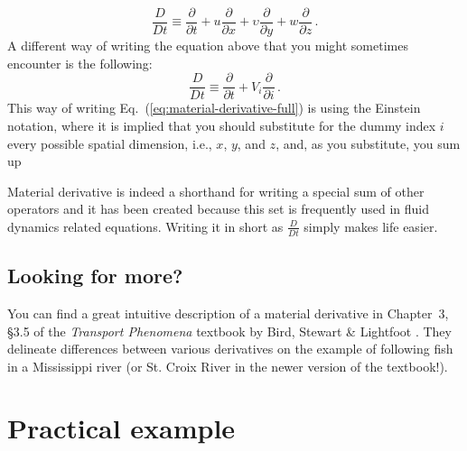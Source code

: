 \begin{equation} \label{eq:material-derivative-full}
\frac{D}{D t} \equiv \frac{\partial}{\partial t} + u \frac{\partial}{\partial x} + \upsilon \frac{\partial}{\partial y} + w \frac{\partial}{\partial z} \, .
\end{equation}
A different way of writing the equation above that you might sometimes encounter is the following:
\begin{equation} \label{eq:material-derivative-ein stein}
\frac{D}{D t} \equiv \frac{\partial}{\partial t} + V_i \frac{\partial}{\partial i} \, .
\end{equation}
This way of writing Eq.~(\ref{eq:material-derivative-full}) is using the Einstein notation, where it is implied that you should substitute for the dummy index $i$ every possible spatial dimension, i.e., $x$, $y$, and $z$, and, as you substitute, you sum up 


Material derivative is indeed a shorthand for writing a special sum of other operators and it has been created because this set is frequently used in fluid dynamics related equations. Writing it in short as $\frac{D}{D t}$ simply makes life easier.







\begin{mdframed}[style=exercise-frame]

\subsection*{Looking for more?}

You can find a great intuitive description of a material derivative in Chapter~3, \S3.5 of the \textit{Transport Phenomena} textbook by Bird, Stewart \& Lightfoot \cite{bird2002transport}. They delineate differences between various derivatives on the example of following fish in a Mississippi river (or St. Croix River in the newer version of the textbook!).

\end{mdframed}





\section{Practical example}




